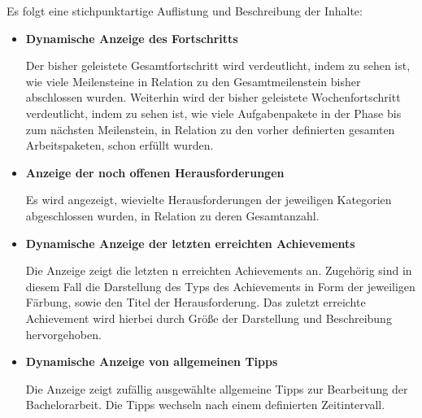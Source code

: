 \documentclass{scrreprt}
\begin{document}
\par \medskip Es folgt eine stichpunktartige Auflistung und Beschreibung der Inhalte:
\begin{itemize}
\item \textbf{Dynamische Anzeige des Fortschritts}
\par Der bisher geleistete Gesamtfortschritt wird verdeutlicht, indem zu sehen ist, wie viele Meilensteine in Relation zu den Gesamtmeilenstein bisher abschlossen wurden. Weiterhin wird der bisher geleistete Wochenfortschritt verdeutlicht, indem zu sehen ist, wie viele Aufgabenpakete in der Phase bis zum nächsten Meilenstein, in Relation zu den vorher definierten gesamten Arbeitspaketen, schon erfüllt wurden.
\item \textbf{Anzeige der noch offenen Herausforderungen}
\par Es wird angezeigt, wievielte Herausforderungen der jeweiligen Kategorien abgeschlossen wurden, in Relation zu deren Gesamtanzahl.
\item \textbf{Dynamische Anzeige der letzten erreichten Achievements}
\par Die Anzeige zeigt die letzten n erreichten Achievements an. Zugehörig sind in diesem Fall die Darstellung des Typs des Achievements in Form der jeweiligen Färbung, sowie den Titel der Herausforderung. Das zuletzt erreichte Achievement wird hierbei durch Größe der Darstellung und Beschreibung hervorgehoben.
\item \textbf{Dynamische Anzeige von allgemeinen Tipps}
\par Die Anzeige zeigt zufällig ausgewählte allgemeine Tipps zur Bearbeitung der Bachelorarbeit. Die Tipps wechseln nach einem definierten Zeitintervall.
\end{itemize}
\end{document}
